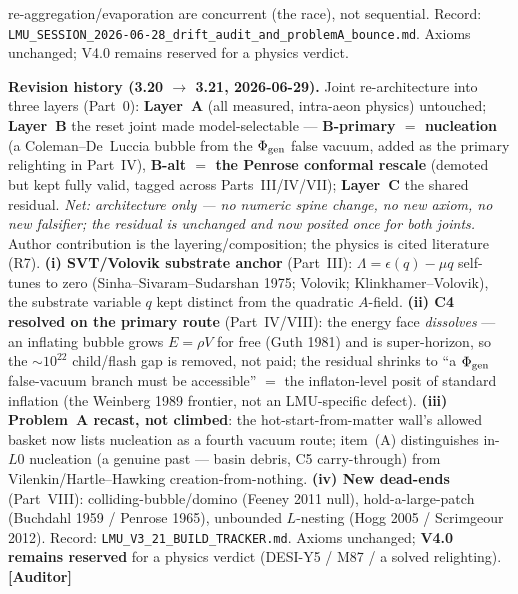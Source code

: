 \documentclass[11pt]{article}
\newcommand{\Auditor}{\textbf{\textcolor{teal!55!black}{[Auditor]}}}
\begin{document}
{re-aggregation/evaporation are concurrent (the race), not sequential. Record: \texttt{LMU\_SESSION\_2026-06-28\_drift\_audit\_and\_problemA\_bounce.md}. Axioms unchanged; V4.0 remains reserved for a physics verdict.

\smallskip\noindent\textbf{Revision history (3.20 $\to$ 3.21, 2026-06-29).} Joint re-architecture into three layers (Part~0): \textbf{Layer~A} (all measured, intra-aeon physics) untouched; \textbf{Layer~B} the reset joint made model-selectable --- \textbf{B-primary $=$ nucleation} (a Coleman--De~Luccia bubble from the $\Phi_{\rm gen}$ false vacuum, added as the primary relighting in Part~IV), \textbf{B-alt $=$ the Penrose conformal rescale} (demoted but kept fully valid, tagged across Parts~III/IV/VII); \textbf{Layer~C} the shared residual. \emph{Net: architecture only --- no numeric spine change, no new axiom, no new falsifier; the residual is unchanged and now posited once for both joints.} Author contribution is the layering/composition; the physics is cited literature (R7). \textbf{(i) SVT/Volovik substrate anchor} (Part~III): $\Lambda=\epsilon(q)-\mu q$ self-tunes to zero (Sinha--Sivaram--Sudarshan 1975; Volovik; Klinkhamer--Volovik), the substrate variable $q$ kept distinct from the quadratic $A$-field. \textbf{(ii) C4 resolved on the primary route} (Part~IV/VIII): the energy face \emph{dissolves} --- an inflating bubble grows $E=\rho V$ for free (Guth 1981) and is super-horizon, so the $\sim\!10^{22}$ child/flash gap is removed, not paid; the residual shrinks to ``a $\Phi_{\rm gen}$ false-vacuum branch must be accessible'' $=$ the inflaton-level posit of standard inflation (the Weinberg 1989 frontier, not an LMU-specific defect). \textbf{(iii) Problem~A recast, not climbed}: the hot-start-from-matter wall's allowed basket now lists nucleation as a fourth vacuum route; item~(A) distinguishes in-$L0$ nucleation (a genuine past --- basin debris, C5 carry-through) from Vilenkin/Hartle--Hawking creation-from-nothing. \textbf{(iv) New dead-ends} (Part~VIII): colliding-bubble/domino (Feeney 2011 null), hold-a-large-patch (Buchdahl 1959 / Penrose 1965), unbounded $L$-nesting (Hogg 2005 / Scrimgeour 2012). Record: \texttt{LMU\_V3\_21\_BUILD\_TRACKER.md}. Axioms unchanged; \textbf{V4.0 remains reserved} for a physics verdict (DESI-Y5 / M87 / a solved relighting). \Auditor

}
\end{document}
